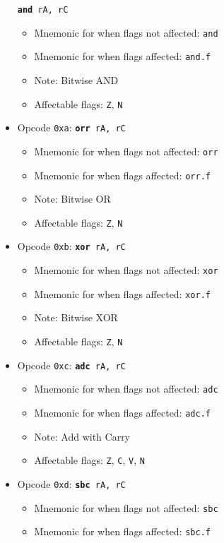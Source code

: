 \documentclass{article}
\begin{document}
\begin{itemize}
			\texttt{\textbf{and} rA, rC}
		\begin{itemize}
			\item Mnemonic for when flags not affected:  \texttt{and}
			\item Mnemonic for when flags affected:  \texttt{and.f}
			\item Note:  Bitwise AND
			\item Affectable flags:
				\texttt{Z}, \texttt{N}
		\end{itemize}
		\item Opcode \texttt{0xa}:
			\texttt{\textbf{orr} rA, rC}
		\begin{itemize}
			\item Mnemonic for when flags not affected:  \texttt{orr}
			\item Mnemonic for when flags affected:  \texttt{orr.f}
			\item Note:  Bitwise OR
			\item Affectable flags:
				\texttt{Z}, \texttt{N}
		\end{itemize}
		\item Opcode \texttt{0xb}:
			\texttt{\textbf{xor} rA, rC}
		\begin{itemize}
			\item Mnemonic for when flags not affected:  \texttt{xor}
			\item Mnemonic for when flags affected:  \texttt{xor.f}
			\item Note:  Bitwise XOR
			\item Affectable flags:
				\texttt{Z}, \texttt{N}
		\end{itemize}
		\item Opcode \texttt{0xc}:
			\texttt{\textbf{adc} rA, rC}
		\begin{itemize}
			\item Mnemonic for when flags not affected:  \texttt{adc}
			\item Mnemonic for when flags affected:  \texttt{adc.f}
			\item Note:  Add with Carry
			\item Affectable flags:
				\texttt{Z}, \texttt{C}, \texttt{V}, \texttt{N}
		\end{itemize}
		\item Opcode \texttt{0xd}:
			\texttt{\textbf{sbc} rA, rC}
		\begin{itemize}
			\item Mnemonic for when flags not affected:  \texttt{sbc}
			\item Mnemonic for when flags affected:  \texttt{sbc.f}

\end{itemize}
\end{itemize}
\end{document}
